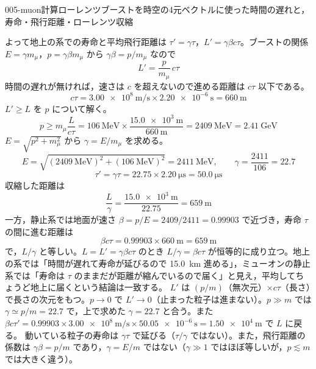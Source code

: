 \documentclass[uplatex,dvipdfmx,a4paper,11pt]{jsarticle}
\begin{document}
\begin{mondai}{005-muon}{計算}{ローレンツブーストを時空の4元ベクトルに使った時間の遅れと，寿命・飛行距離・ローレンツ収縮}
\begin{tadashii}
よって地上の系での寿命と平均飛行距離は $\tau'=\gamma\tau$，$L'=\gamma\beta c\tau$。ブーストの関係 $E=\gamma m_\mu$，$p=\gamma\beta m_\mu$ から $\gamma\beta=p/m_\mu$ なので
\[ L'=\frac{p}{m_\mu}\,c\tau \]
 時間の遅れが無ければ，速さは $c$ を超えないので進める距離は $c\tau$ 以下である。
\[ c\tau=\qty{3.00e8}{\metre\per\second}\times\qty{2.20e-6}{\second}=\qty{660}{\metre} \]
 $L'\ge L$ を $p$ について解く。
\[ p\ge m_\mu\frac{L}{c\tau}=\qty{106}{\mega\electronvolt}\times\frac{\qty{15.0e3}{\metre}}{\qty{660}{\metre}}=\qty{2409}{\mega\electronvolt}=\qty{2.41}{\giga\electronvolt} \]
 $E=\sqrt{p^2+m_\mu^2}$ から $\gamma=E/m_\mu$ を求める。
\[ E=\sqrt{(\qty{2409}{\mega\electronvolt})^2+(\qty{106}{\mega\electronvolt})^2}=\qty{2411}{\mega\electronvolt},\qquad \gamma=\frac{2411}{106}=22.7 \]
\[ \tau'=\gamma\tau=22.75\times\qty{2.20}{\micro\second}=\qty{50.0}{\micro\second} \]
 収縮した距離は
\[ \frac{L}{\gamma}=\frac{\qty{15.0e3}{\metre}}{22.75}=\qty{659}{\metre} \]
一方，静止系では地面が速さ $\beta=p/E=2409/2411=0.99903$ で近づき，寿命 $\tau$ の間に進む距離は
\[ \beta c\tau=0.99903\times\qty{660}{\metre}=\qty{659}{\metre} \]
で，$L/\gamma$ と等しい。$L=L'=\gamma\beta c\tau$ のとき $L/\gamma=\beta c\tau$ が恒等的に成り立つ。地上の系では「時間が遅れて寿命が延びるので \qty{15.0}{\kilo\metre} 進める」，ミューオンの静止系では「寿命は $\tau$ のままだが距離が縮んでいるので届く」と見え，平均してちょうど地上に届くという結論は一致する。
\kenzan $L'$ は $(p/m)$（無次元）$\times c\tau$（長さ）で長さの次元をもつ。$p\to0$ で $L'\to0$（止まった粒子は進まない）。$p\gg m$ では $\gamma\simeq p/m=22.7$ で，上で求めた $\gamma=22.7$ と合う。また $\beta c\tau'=0.99903\times\qty{3.00e8}{\metre\per\second}\times\qty{50.05e-6}{\second}=\qty{1.50e4}{\metre}$ で $L$ に戻る。
\tsumazuki 動いている粒子の寿命は $\gamma\tau$ で延びる（$\tau/\gamma$ ではない）。また，飛行距離の係数は $\gamma\beta=p/m$ であり，$\gamma=E/m$ ではない（$\gamma\gg1$ ではほぼ等しいが，$p\lesssim m$ では大きく違う）。
\end{tadashii}
\end{mondai}

\noteowari
\end{document}
